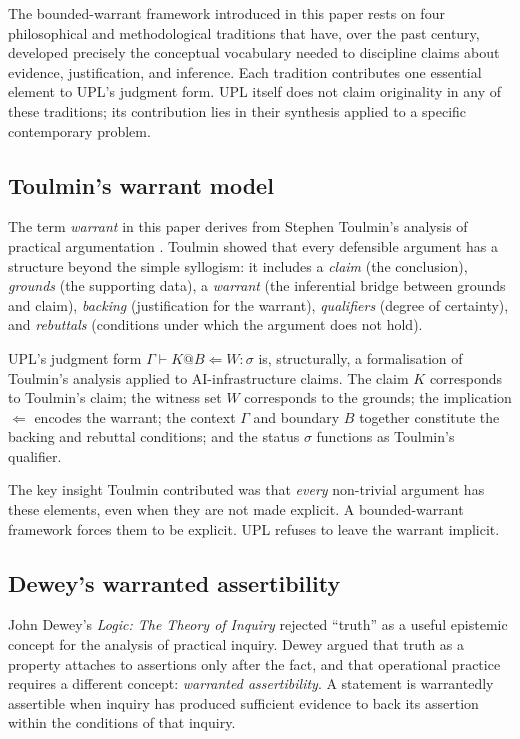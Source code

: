 \documentclass[11pt, a4paper]{article}
\theoremstyle{upldef}
\begin{document}
The bounded-warrant framework introduced in this paper rests on
four philosophical and methodological traditions that have, over
the past century, developed precisely the conceptual vocabulary
needed to discipline claims about evidence, justification, and
inference. Each tradition contributes one essential element to
UPL's judgment form. UPL itself does not claim originality in any
of these traditions; its contribution lies in their synthesis
applied to a specific contemporary problem.

\subsection{Toulmin's warrant model}
\label{sec:toulmin}

The term \emph{warrant} in this paper derives from Stephen Toulmin's
analysis of practical argumentation \citep{toulmin1958}. Toulmin
showed that every defensible argument has a structure beyond the
simple syllogism: it includes a \emph{claim} (the conclusion),
\emph{grounds} (the supporting data), a \emph{warrant} (the
inferential bridge between grounds and claim), \emph{backing}
(justification for the warrant), \emph{qualifiers} (degree of
certainty), and \emph{rebuttals} (conditions under which the
argument does not hold).

UPL's judgment form
$\Gamma \vdash K @ B \Leftarrow W : \sigma$
is, structurally, a formalisation of Toulmin's analysis applied to
AI-infrastructure claims. The claim $K$ corresponds to Toulmin's
claim; the witness set $W$ corresponds to the grounds; the
implication $\Leftarrow$ encodes the warrant; the context $\Gamma$
and boundary $B$ together constitute the backing and rebuttal
conditions; and the status $\sigma$ functions as Toulmin's
qualifier.

The key insight Toulmin contributed was that \emph{every}
non-trivial argument has these elements, even when they are not
made explicit. A bounded-warrant framework forces them to be
explicit. UPL refuses to leave the warrant implicit.

\subsection{Dewey's warranted assertibility}
\label{sec:dewey}

John Dewey's \emph{Logic: The Theory of Inquiry}
\citep{dewey1938} rejected ``truth'' as a useful epistemic concept
for the analysis of practical inquiry. Dewey argued that truth as a
property attaches to assertions only after the fact, and that
operational practice requires a different concept:
\emph{warranted assertibility}. A statement is warrantedly
assertible when inquiry has produced sufficient evidence to back
its assertion within the conditions of that inquiry.
\end{document}
